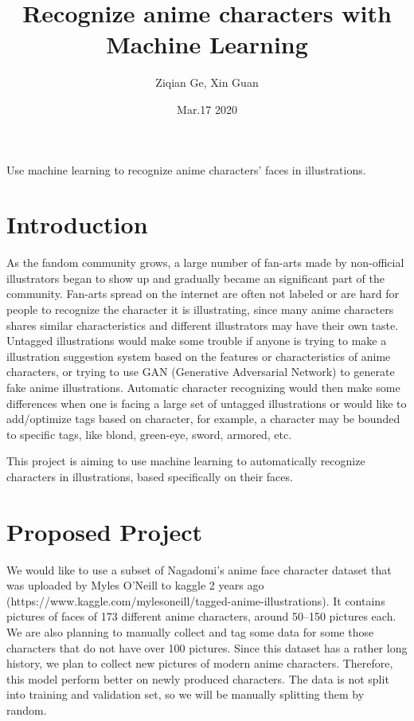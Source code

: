 \documentclass[12pt]{article}
\title{Recognize anime characters with Machine Learning}
\author{Ziqian Ge, Xin Guan}
\date{Mar.17 2020}
\begin{document}
\maketitle

\abstract
Use machine learning to recognize anime characters' faces in illustrations.

\section{Introduction}

As the fandom community grows, a large number of fan-arts made by non-official illustrators began to show up and gradually became an significant part of the community.
Fan-arts spread on the internet are often not labeled or are hard for people to recognize the character it is illustrating, since many anime characters shares similar characteristics and different illustrators may have their own taste.
Untagged illustrations would make some trouble if anyone is trying to make a illustration suggestion system based on the features or characteristics of anime characters, or trying to use GAN (Generative Adversarial Network) to generate fake anime illustrations.
Automatic character recognizing would then make some differences when one is facing a large set of untagged illustrations or would like to add/optimize tags based on character, for example, a character may be bounded to specific tags, like blond, green-eye, sword, armored, etc.

This project is aiming to use machine learning to automatically recognize characters in illustrations, based specifically on their faces.


\section{Proposed Project}

We would like to use a subset of Nagadomi's anime face character dataset that was uploaded by Myles O'Neill to kaggle 2 years ago (https://www.kaggle.com/mylesoneill/tagged-anime-illustrations).
It contains pictures of faces of 173 different anime characters, around 50--150 pictures each.
We are also planning to manually collect and tag some data for some those characters that do not have over 100 pictures.
Since this dataset has a rather long history, we plan to collect new pictures of modern anime characters. Therefore, this model perform better on newly produced characters.
The data is not split into training and validation set, so we will be manually splitting them by random.
\end{document}
